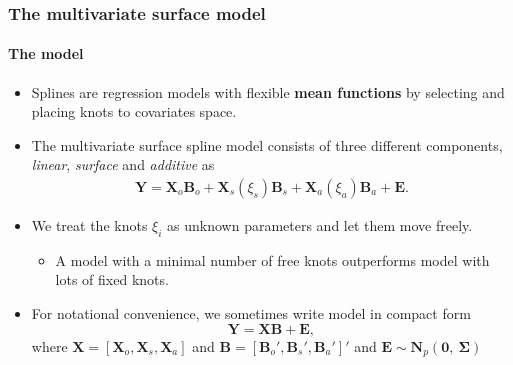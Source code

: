 \documentclass[10pt]{beamer}
\begin{document}
\begin{frame}
  \frametitle{The multivariate surface model}
  \framesubtitle{The model}
  \begin{itemize}
  \item Splines are regression models with flexible \textbf{mean functions} by
    selecting and placing knots to covariates space.

  \item The multivariate surface spline model \citep{li2013efficient} consists of three different components,
    {\color{blue}\emph{linear}}, {\color{blue}\emph{surface}} and
    {\color{blue}\emph{additive}} as
    \[\begin{gathered}
      \bm{Y}=\bm{X}_o\bm{B}_o+
      \bm{X}_s(\xi_s)\bm{B}_s+\bm{X}_a(\xi_a)\bm{B}_a + \bm{E}.
    \end{gathered}\]
  \item We treat the knots $\xi_i$ as unknown parameters and let them move
    freely.
    \begin{itemize}
    \item A model with a minimal number of free knots outperforms model with lots
      of fixed knots.
    \end{itemize}
  \item For notational convenience, we sometimes write model in compact form
    \[
    \bm{Y}=\bm{X}\bm{B}+\bm{E},
    \]
    where $\bm{X}=[\bm{X}_{o},\bm{X}_{s},\bm{X}_{a}]$ and
    $\bm{B}=[{\bm{B}_{o}}',{\bm{B}_{s}}',{\bm{B}_{a}}']'$ and $\bm{E}\sim \bm{N}_p(\bm{0},~\bm{\Sigma})$
  \end{itemize}
\end{frame}
\end{document}
